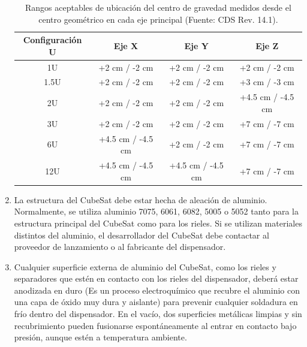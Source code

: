 \documentclass[12pt]{article}
\begin{document}
\begin{enumerate}
		\begin{table}[h!]
			\centering
			\renewcommand{\arraystretch}{1} %
			\begin{tabular}{|c|c|c|c|}
				\hline
				Configuración U & Eje X & Eje Y & Eje Z \\
				\hline
				1U   & +2 cm / -2 cm & +2 cm / -2 cm & +2 cm / -2 cm \\ \hline
				1.5U & +2 cm / -2 cm & +2 cm / -2 cm & +3 cm / -3 cm \\ \hline
				2U   & +2 cm / -2 cm & +2 cm / -2 cm & +4.5 cm / -4.5 cm \\ \hline
				3U   & +2 cm / -2 cm & +2 cm / -2 cm & +7 cm / -7 cm \\ \hline
				6U   & +4.5 cm / -4.5 cm & +2 cm / -2 cm & +7 cm / -7 cm \\ \hline
				12U  & +4.5 cm / -4.5 cm & +4.5 cm / -4.5 cm & +7 cm / -7 cm \\
				\hline
			\end{tabular}
			\caption{Rangos aceptables de ubicación del centro de gravedad medidos desde el centro geométrico en cada eje principal (Fuente: CDS Rev. 14.1).}
			\label{tab:centro_gravedad}
		\end{table}
		
		\item La estructura del CubeSat debe estar hecha de aleación de aluminio. Normalmente, se utiliza aluminio 7075, 6061, 6082, 5005 o 5052 tanto para la estructura principal del CubeSat como para los rieles. Si se utilizan materiales distintos del aluminio, el desarrollador del CubeSat debe contactar al proveedor de lanzamiento o al fabricante del dispensador.
		
		\item Cualquier superficie externa de aluminio del CubeSat, como los rieles y separadores que estén en contacto con los rieles del dispensador, deberá estar anodizada en duro (Es un proceso electroquímico que recubre el aluminio con una capa de óxido muy dura y aislante) para prevenir cualquier soldadura en frío dentro del dispensador. En el vacío, dos superficies metálicas limpias y sin recubrimiento pueden fusionarse espontáneamente al entrar en contacto bajo presión, aunque estén a temperatura ambiente.
		

\end{enumerate}
\end{document}
